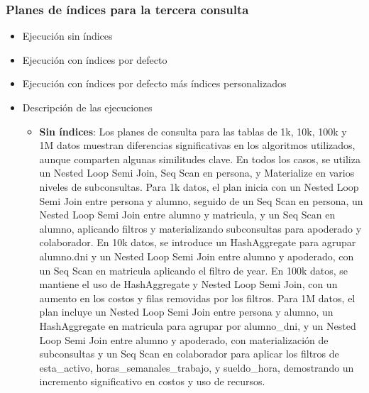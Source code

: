 \subsubsection{Planes de índices para la tercera consulta}
\begin{itemize}
	\item{Ejecución sin índices}
	\item{Ejecución con índices por defecto}
	\item{Ejecución con índices por defecto más índices personalizados}
      \item{Descripción de las ejecuciones}
      \begin{itemize}
            \item {\textbf{Sin índices}: Los planes de consulta para las tablas de 1k, 10k, 100k y 1M datos muestran diferencias significativas en los algoritmos utilizados, aunque comparten algunas similitudes clave. En todos los casos, se utiliza un Nested Loop Semi Join, Seq Scan en persona, y Materialize en varios niveles de subconsultas. Para 1k datos, el plan inicia con un Nested Loop Semi Join entre persona y alumno, seguido de un Seq Scan en persona, un Nested Loop Semi Join entre alumno y matricula, y un Seq Scan en alumno, aplicando filtros y materializando subconsultas para apoderado y colaborador. En 10k datos, se introduce un HashAggregate para agrupar alumno.dni y un Nested Loop Semi Join entre alumno y apoderado, con un Seq Scan en matricula aplicando el filtro de year. En 100k datos, se mantiene el uso de HashAggregate y Nested Loop Semi Join, con un aumento en los costos y filas removidas por los filtros. Para 1M datos, el plan incluye un Nested Loop Semi Join entre persona y alumno, un HashAggregate en matricula para agrupar por alumno\_dni, y un Nested Loop Semi Join entre alumno y apoderado, con materialización de subconsultas y un Seq Scan en colaborador para aplicar los filtros de esta\_activo, horas\_semanales\_trabajo, y sueldo\_hora, demostrando un incremento significativo en costos y uso de recursos.}

\end{itemize}
\end{itemize}
